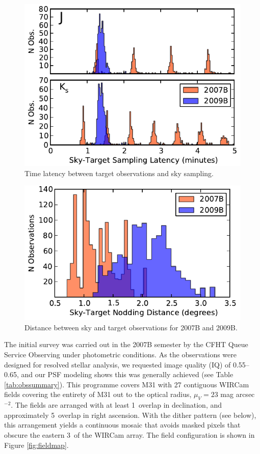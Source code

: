 \documentclass[iop]{emulateapj}
\begin{document}
\begin{figure}[t]
    \centering
        \includegraphics[width=\textwidth]{figs/sky_target_lag.pdf}
    \caption{Time latency between target observations and sky sampling.}
    \label{fig:sky_target_lag}
\end{figure}

\begin{figure}[t]
    \centering
        \includegraphics[width=\textwidth]{figs/sky_target_dist.pdf}
    \caption{Distance between sky and target observations for 2007B and 2009B.}
    \label{fig:sky_target_dist}
\end{figure}

The initial survey was carried out in the 2007B semester by the CFHT Queue Service Observing under photometric conditions. As the observations were designed for resolved stellar analysis, we requested image quality (IQ) of 0.55\arcsec--0.65\arcsec, and our PSF modeling shows this was generally achieved (see Table \ref{tab:obssummary}). This programme covers M31 with 27 contiguous WIRCam fields covering the entirety of M31 out to the optical radius, $\mu_V=23$ mag arcsec$^{-2}$. The fields are arranged with at least 1\arcmin\ overlap in declination, and approximately 5\arcmin\ overlap in right ascension.
With the dither pattern (see below), this arrangement yields a continuous mosaic that avoids masked pixels that obscure the eastern 3\arcmin\ of the WIRCam array. The field configuration is shown in Figure \ref{fig:fieldmap}.
\end{document}
